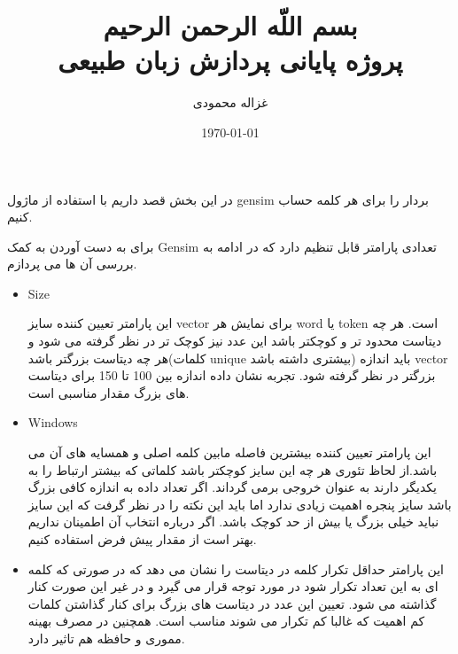 \documentclass[10pt]{article}
\begin{document}
\title{بسم اللّه الرحمن الرحیم
	\\[25pt]	پروژه پایانی پردازش زبان طبیعی
}
\author{غزاله محمودی}

\date{\today}
\maketitle
\newpage

\tableofcontents
\newpage

\listoffigures
\newpage

\listoftables
\newpage
	
\section{ 
}
در این بخش قصد داریم با استفاده از ماژول gensim بردار
  را برای هر کلمه حساب کنیم. 

برای به دست آوردن
 به کمک Gensim تعدادی پارامتر قابل تنظیم دارد که در ادامه به بررسی آن ها می پردازم.

\begin{itemize}
	\item Size 
	
	این پارامتر تعیین کننده سایز vector برای نمایش هر word یا token است. هر چه دیتاست محدود تر و کوچکتر باشد این عدد نیز کوچک تر در نظر گرفته می شود و هر چه دیتاست بزرگتر باشد(کلمات unique بیشتری داشته باشد) باید اندازه vector بزرگتر در نظر گرفته شود. تجربه نشان داده اندازه بین 100 تا 150 برای دیتاست های بزرگ مقدار مناسبی است.
	
	\item Windows 
	
	این پارامتر تعیین کننده بیشترین فاصله مابین کلمه اصلی و همسایه های آن می باشد.از لحاظ تئوری هر چه این سایز کوچکتر باشد کلماتی که بیشتر ارتباط را به یکدیگر دارند به عنوان خروجی برمی گرداند. اگر تعداد داده به اندازه کافی بزرگ باشد سایز پنجره اهمیت زیادی ندارد اما باید این نکته را در نظر گرفت که این سایز نباید خیلی بزرگ یا بیش از حد کوچک باشد. اگر درباره انتخاب آن اطمینان نداریم بهتر است از مقدار پیش فرض استفاده کنیم.
	
	
	\item {}
	
	این پارامتر حداقل تکرار کلمه در دیتاست را نشان می دهد که در صورتی که کلمه ای به این تعداد تکرار شود در
	 مورد توجه قرار می گیرد و در غیر این صورت کنار گذاشته می شود. تعیین این عدد در دیتاست های بزرگ برای کنار گذاشتن کلمات کم اهمیت که غالبا کم تکرار می شوند مناسب است. همچنین در مصرف بهینه مموری و حافظه هم تاثیر دارد.
	
	 
	
\end{itemize}
\end{document}
